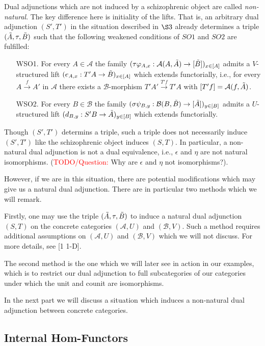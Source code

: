\documentclass[12pt,a4paper]{article}
\def\HomA{\ensuremath\mathcal{A}}
\def\HomB{\ensuremath\mathcal{B}}
\def\t{\ensuremath\tilde}
\begin{document}
Dual adjunctions which are not induced by a schizophrenic object are called \emph{non-natural}. The key difference here is initiality of the lifts. That is, an arbitrary dual adjunction $(S', T')$ in the situation described in $\S 3$ already determines a triple $(\t A, \tau, \t B)$ such that the following weakened conditions of $SO1$ and $SO2$ are fulfilled:
\begin{enumerate}
		\item[WSO1.] For every $A \in \mathcal{A}$ the family $(\tau\varphi_{A,x}: \HomA(A, \t A) \to [\t B])_{x \in [A]}$ admits a $V$-structured lift $(e_{A,x}:T'A \to \t B)_{x \in [A]}$ which extends functorially, i.e., for every $A \stackrel{f}{\to} A'$ in $\mathcal{A}$ there exists a $\mathcal{B}$-morphism $T'A' \stackrel{T'f}{\to}T'A$ with $[T'f] = \HomA(f,\t A)$. 
		\item[WSO2.] For every $B \in \mathcal{B}$ the family $(\sigma\psi_{B,y}: \HomB(B, \t B) \to [\t A])_{y \in [B]}$ admits a $U$-structured lift $(d_{B,y}:S'B \to \t A)_{y \in [B]}$ which extends functorially.
	\end{enumerate}
	
Though $(S',T')$ determins a triple, such a triple does not necessarily induce $(S',T')$ like the schizophrenic object induces $(S,T)$. In particular, a non-natural dual adjunction is not a dual equivalence, i.e., $\epsilon$ and $\eta$ are not natural isomorphisms. (\textcolor{red}{TODO/Question:} Why are $\epsilon$ and $\eta$ not isomorphisms?).

However, if we are in this situation, there are potential modifications which may give us a natural dual adjunction. There are in particular two methods which we will remark. 

Firstly, one may use the triple $(\t A, \tau, \t B)$ to induce a natural dual adjunction $(S,T)$ on the concrete categories $(\mathcal{A}, U)$ and $(\mathcal{B},V)$. Such a method requires additional assumptions on $(\mathcal{A},U)$ and $(\mathcal{B},V)$ which we will not discuss. For more details, see [1 1-D]. 

The second method is the one which we will later see in action in our examples, which is to restrict our dual adjunction to full subcategories of our categories under which the unit and counit are isomorphisms. 

In the next part we will discuss a situation which induces a non-natural dual adjunction between concrete categories.
\subsection{Internal Hom-Functors}
\end{document}

